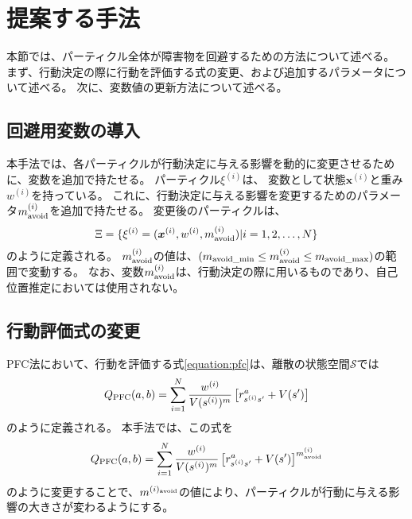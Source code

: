 \section{提案する手法} \label{section:回避重み}
本節では、パーティクル全体が障害物を回避するための方法について述べる。
まず、行動決定の際に行動を評価する式の変更、および追加するパラメータについて述べる。
次に、変数値の更新方法について述べる。

\subsection{回避用変数の導入}
本手法では、各パーティクルが行動決定に与える影響を動的に変更させるために、変数を追加で持たせる。
パーティクル$\xi^{(i)}$は、 変数として状態$\bm{x}^{(i)}$と重み$w^{(i)}$を持っている。
これに、行動決定に与える影響を変更するためのパラメータ$m^{(i)}_{\rm avoid}$を追加で持たせる。
変更後のパーティクルは、
\begin{equation}
\label{particles}
  \Xi = \{ \xi^{(i)} =
               (\bm{x}^{(i)}, w^{(i)}, m^{(i)}_{\rm avoid}) |i = 1,2,\dots,N \}
\end{equation}
のように定義される。
$m^{(i)}_{\rm avoid}$の値は、$(m_{\rm avoid\_min} \leq m^{(i)}_{\rm avoid} \leq m_{\rm avoid\_max})$の範囲で変動する。
なお、変数$m^{(i)}_{\rm avoid}$は、行動決定の際に用いるものであり、自己位置推定においては使用されない。

\subsection{行動評価式の変更}
PFC法において、行動を評価する式\ref{equation:pfc}は、離散の状態空間$\mathcal{S}$では
\begin{equation}
\label{equation:finite pfc}
  Q_{\rm PFC}(a, b) = \sum_{i=1}^{N} \frac{ w^{(i)} }{ V(s^{(i)})^{m} }
                      \left[r^{a}_{s^{(i)} s^{\prime}} + V(s^{\prime}) \right]
\end{equation}
のように定義される。
本手法では、この式を
\begin{equation}
\label{equation:modified pfc}
  Q_{\rm PFC}(a, b) = \sum_{i=1}^{N} \frac{ w^{(i)} }{ V(s^{(i)})^{m} }
                      \left[r^{a}_{s^{(i)} s^{\prime}}
                            + V(s^{\prime}) \right] ^{m^{(i)}_{\rm avoid}}
\end{equation}
のように変更することで、$m^{(i)_{\rm avoid}}$の値により、パーティクルが行動に与える影響の大きさが変わるようにする。

